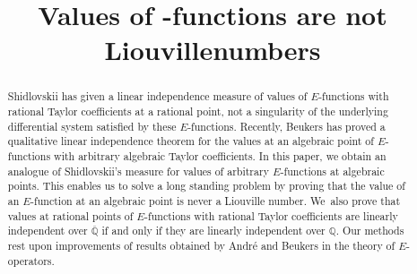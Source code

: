 \documentclass[JEP,XML,SOM,Unicode,published]{cedram}
\theoremstyle{definition}
\begin{document}
\frontmatter
\title{Values of -functions are not Liouville\nobreakspace numbers}

\author[\initial{S.} \lastname{Fischler}]{ }
\address{Université Paris-Saclay, CNRS, Laboratoire de mathématiques d'Orsay,\\ 91405 Orsay, France}

\author[\initial{T.} \lastname{Rivoal}]{ }
\address{Université Grenoble Alpes, CNRS, Institut Fourier, CS 40700,\\ 38058 Grenoble cedex 9, France}

\begin{abstract}
Shidlovskii has given a linear independence measure of values of $E$-functions with rational Taylor coefficients at a rational point, not a singularity of the underlying differential system satisfied by these $E$-functions. Recently, Beukers has proved a qualitative linear independence theorem for the values at an algebraic point of $E$-functions with arbitrary algebraic Taylor coefficients. In this paper, we obtain an analogue of Shidlovskii's measure for values of arbitrary $E$-functions at algebraic points. This enables us to solve a long standing problem by proving that the value of an $E$-function at an algebraic point is never a Liouville number. We~also prove that values at rational points of $E$-functions with rational Taylor coefficients are linearly independent over $\overline{\mathbb{Q}}$ if and only if they are linearly independent over $\mathbb{Q}$. Our methods rest upon improvements of results obtained by André and Beukers in the theory of $E$-operators.
\end{abstract}




\end{document}
